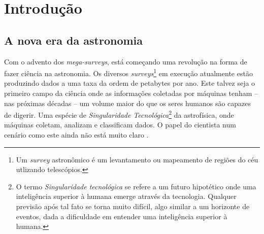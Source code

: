


\chapter{Introdução}
\label{sec:Intro}


\section{A nova era da astronomia}
\label{sec:Intro:NovaEra}

Com o advento dos {\em mega-surveys}, está começando uma revolução na forma de
fazer ciência na astronomia. Os diversos {\em surveys}\footnote{Um {\em survey}
astronômico é um levantamento ou mapeamento de regiões do céu utlizando
telescópios.} em execução atualmente estão produzindo dados a uma taxa da ordem
de petabytes por ano. Este talvez seja o primeiro campo da ciência onde as
informações coletadas por máquinas tenham -- nas próximas décadas -- um volume
maior do que os seres humanos são capazes de digerir. Uma espécie de {\em
Singularidade Tecnológica}\footnote{O termo {\em Singularidade tecnológica} se
refere a um futuro hipotético onde uma inteligência superior à humana emerge
através da tecnologia. Qualquer previsão após tal fato se torna muito difícil,
algo similar a um horizonte de eventos, dada a dificuldade em entender uma
inteligência superior à humana.} da astrofísica, onde máquinas coletam, analizam
e classificam dados. O papel do cientista num cenário como este ainda não está
muito claro \citep{Norris2010}.

